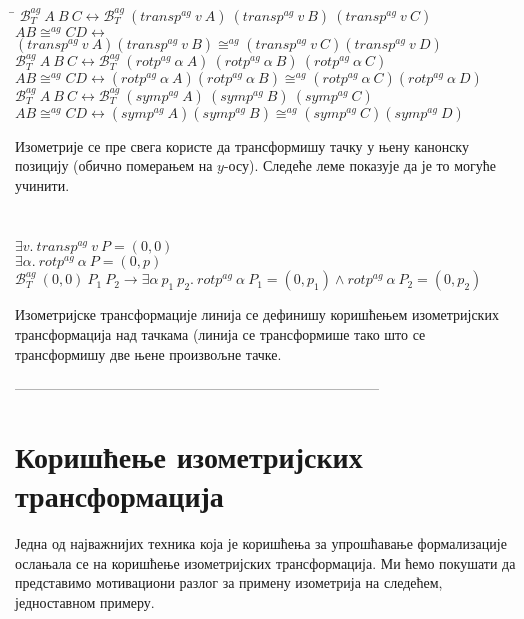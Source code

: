 \documentclass[a4paper, 12pt]{article}
\newcommand{\agbett}[3]{\ensuremath{\mathcal{B}_T^{\mathit{ag}}\ #1\ #2\ #3}}
\newcommand{\agcongr}[4]{\ensuremath{#1#2 \cong^{ag} #3#4}}
\newcommand{\agtransp}[2]{\ensuremath{transp^{ag}\ #1\ #2}}
\newcommand{\agrotp}[2]{\ensuremath{rotp^{ag}\ #1\ #2}}
\newcommand{\agsymp}[1]{\ensuremath{symp^{ag}\ #1}}
\begin{document}
{\tt
\begin{tabbing}
\hspace{5mm}\=\kill
$ \agbett{A}{B}{C} \longleftrightarrow \agbett{(\agtransp{v}{A})}{(\agtransp{v}{B})}{(\agtransp{v}{C})}$\\
$\agcongr{A}{B}{C}{D} \longleftrightarrow$\\
\> $\agcongr{(\agtransp{v}{A})}{(\agtransp{v}{B})}{(\agtransp{v}{C})}{(\agtransp{v}{D})}$\\
$\agbett{A}{B}{C} \longleftrightarrow \agbett{(\agrotp{\alpha}{A})}{(\agrotp{\alpha}{B})}{(\agrotp{\alpha}{C})}$\\
$\agcongr{A}{B}{C}{D} \longleftrightarrow
   \agcongr{(\agrotp{\alpha}{A})}{(\agrotp{\alpha}{B})}{(\agrotp{\alpha}{C})}{(\agrotp{\alpha}{D})}$\\
$\agbett{A}{B}{C} \longleftrightarrow \agbett{(\agsymp{A})}{(\agsymp{B})}{(\agsymp{C})}$\\
$\agcongr{A}{B}{C}{D} \longleftrightarrow
   \agcongr{(\agsymp{A})}{(\agsymp{B})}{(\agsymp{C})}{(\agsymp{D})}$
\end{tabbing}
}

Изометрије се пре свега користе да трансформишу тачку у њену канонску
позицију (обично померањем на $y$-осу).  Следеће леме показује да је
то могуће учинити.

{\tt
\begin{tabbing}
$\exists v.\ \agtransp{v}{P} = (0, 0)$\\
$\exists \alpha.\ \agrotp{\alpha}{P} = (0, p)$\\
$\agbett{(0, 0)}{P_1}{P_2} \longrightarrow \exists \alpha\ p_1\
p_2.\ \agrotp{\alpha}{P_1} = (0, p_1) \wedge \agrotp{\alpha}{P_2}
= (0, p_2)$
\end{tabbing}
}

Изометријске трансформације линија се дефинишу коришћењем
изометријских трансформација над тачкама (линија се трансформише тако
што се трансформишу две њене произвољне тачке.

 ------------------------------------------------------------------------------
\section{Коришћење изометријских трансформација}
\label{sec:iso}
Једна од најважнијих техника која је коришћења за упрошћавање
формализације ослањала се на коришћење изометријских
трансформација. Ми ћемо покушати да представимо мотивациони разлог за
примену изометрија на следећем, једноставном примеру.
\end{document}
